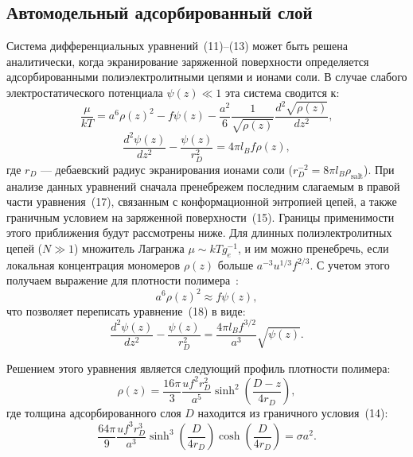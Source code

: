 \documentclass[12pt,a4paper]{article}
\begin{document}
\subsection{Автомодельный адсорбированный слой}

Система дифференциальных уравнений~(11)--(13) может быть решена аналитически, когда экранирование заряженной поверхности определяется адсорбированными полиэлектролитными цепями и ионами соли. В случае слабого электростатического потенциала $\psi(z) \ll 1$ эта система сводится к:
\begin{equation}
\frac{\mu}{k T} = a^6 \rho(z)^2 - f \psi(z) - \frac{a^2}{6}\frac{1}{\sqrt{\rho(z)}}\frac{d^2\sqrt{\rho(z)}}{dz^2},
\end{equation}
\begin{equation}
\frac{d^2\psi(z)}{dz^2} - \frac{\psi(z)}{r_D^2} = 4\pi l_B f \rho(z),
\end{equation}
где $r_D$ --- дебаевский радиус экранирования ионами соли ($r_D^{-2} = 8\pi l_B \rho_{\text{salt}}$). При анализе данных уравнений сначала пренебрежем последним слагаемым в правой части уравнения~(17), связанным с конформационной энтропией цепей, а также граничным условием на заряженной поверхности~(15). Границы применимости этого приближения будут рассмотрены ниже. Для длинных полиэлектролитных цепей ($N \gg 1$) множитель Лагранжа $\mu \sim k T g_e^{-1}$, и им можно пренебречь, если локальная концентрация мономеров $\rho(z)$ больше $a^{-3} u^{1/3} f^{2/3}$. С учетом этого получаем выражение для плотности полимера~\cite{deGennes1976, deGennes1979, Dobrynin1995, Israelachvili1985}:
\begin{equation}
a^6 \rho(z)^2 \approx f \psi(z),
\end{equation}
что позволяет переписать уравнение~(18) в виде:
\begin{equation}
\frac{d^2\psi(z)}{dz^2} - \frac{\psi(z)}{r_D^2} = \frac{4\pi l_B f^{3/2}}{a^3} \sqrt{\psi(z)}.
\end{equation}

Решением этого уравнения является следующий профиль плотности полимера:
\begin{equation}
\rho(z) = \frac{16\pi}{3} \frac{u f^2 r_D^2}{a^5} \sinh^2 \left( \frac{D - z}{4 r_D} \right),
\end{equation}
где толщина адсорбированного слоя $D$ находится из граничного условия~(14):
\begin{equation}
\frac{64\pi}{9} \frac{u f^3 r_D^3}{a^3} \sinh^3\left(\frac{D}{4r_D}\right) \cosh\left(\frac{D}{4r_D}\right) = \sigma a^2.
\end{equation}
\end{document}
